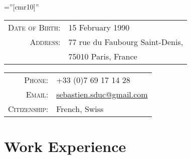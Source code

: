 \documentclass[a4paper,10pt]{article} %
\begin{document}
\pagestyle{empty} %

\font\fb=''[cmr10]'' %


\par{\par} %


\begin{tabular}{rl}
\textsc{Date of Birth:} & 15 February 1990 \\
\textsc{Address:} & 77 rue du Faubourg Saint-Denis,\\ 
                  & 75010 Paris, France \\
\end{tabular}
\quad\quad\quad\quad\quad
\begin{tabular}{rl}
\textsc{Phone:} & +33 (0)7 69 17 14 28\\
\textsc{Email:} & \href{mailto:sebastien.sduc@gmail.com}{sebastien.sduc@gmail.com}\\
\textsc{Citizenship:} & French, Swiss
\end{tabular}


\section{Work Experience}
\end{document}
